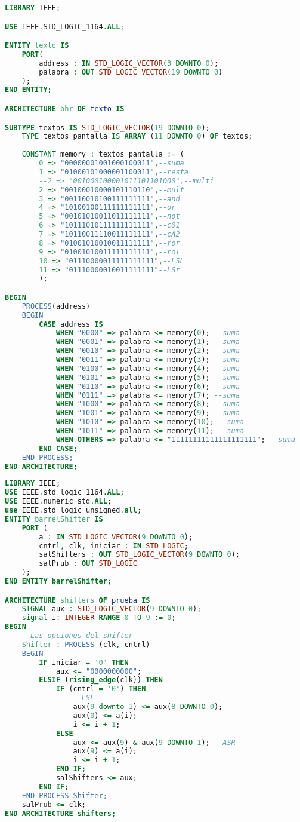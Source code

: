\begin{lstlisting}[language={vhdl}, caption={Display}, label={Script}]
LIBRARY IEEE;

USE IEEE.STD_LOGIC_1164.ALL;

ENTITY texto IS
	PORT(
		address : IN STD_LOGIC_VECTOR(3 DOWNTO 0);
		palabra : OUT STD_LOGIC_VECTOR(19 DOWNTO 0)
	);
END ENTITY;

ARCHITECTURE bhr OF texto IS

SUBTYPE textos IS STD_LOGIC_VECTOR(19 DOWNTO 0);
	TYPE textos_pantalla IS ARRAY (11 DOWNTO 0) OF textos;
	
	CONSTANT memory : textos_pantalla := (
		0 => "00000001001000100011",--suma
		1 => "01000101000001100011",--resta
		--2 => "001000100001011101101000",--multi
		2 => "00100010000101110110",--mult
		3 => "00110010100111111111",--and
		4 => "10100100111111111111",--or
		5 => "00101010011011111111",--not
		6 => "10111010111111111111",--c01
		7 => "10110011110011111111",--cA2
		8 => "01001010010011111111",--ror
		9 => "01001010011111111111",--rol
		10 => "01110000011111111111",--LSL
		11 => "01110000010011111111"--LSr
		);

BEGIN
	PROCESS(address)
	BEGIN
		CASE address IS
			WHEN "0000" => palabra <= memory(0); --suma
			WHEN "0001" => palabra <= memory(1); --suma
			WHEN "0010" => palabra <= memory(2); --suma
			WHEN "0011" => palabra <= memory(3); --suma
			WHEN "0100" => palabra <= memory(4); --suma
			WHEN "0101" => palabra <= memory(5); --suma
			WHEN "0110" => palabra <= memory(6); --suma
			WHEN "0111" => palabra <= memory(7); --suma
			WHEN "1000" => palabra <= memory(8); --suma
			WHEN "1001" => palabra <= memory(9); --suma
			WHEN "1010" => palabra <= memory(10); --suma
			WHEN "1011" => palabra <= memory(11); --suma
			WHEN OTHERS => palabra <= "11111111111111111111"; --suma
		END CASE;
	END PROCESS;
END ARCHITECTURE;
	\end{lstlisting}
	\begin{lstlisting}[language={vhdl}, caption={Barrel Shifter}, label={Script}]
LIBRARY IEEE;
USE IEEE.std_logic_1164.ALL;
USE IEEE.numeric_std.ALL;
use IEEE.std_logic_unsigned.all;
ENTITY barrelShifter IS
    PORT (
        a : IN STD_LOGIC_VECTOR(9 DOWNTO 0);
        cntrl, clk, iniciar : IN STD_LOGIC;
        salShifters : OUT STD_LOGIC_VECTOR(9 DOWNTO 0);
        salPrub : OUT STD_LOGIC
    );
END ENTITY barrelShifter;

ARCHITECTURE shifters OF prueba IS
    SIGNAL aux : STD_LOGIC_VECTOR(9 DOWNTO 0);
    signal i: INTEGER RANGE 0 TO 9 := 0;
BEGIN
    --Las opciones del shifter
    Shifter : PROCESS (clk, cntrl)
    BEGIN
        IF iniciar = '0' THEN
            aux <= "0000000000";
        ELSIF (rising_edge(clk)) THEN
            IF (cntrl = '0') THEN
                --LSL
                aux(9 downto 1) <= aux(8 DOWNTO 0);
                aux(0) <= a(i);
                i <= i + 1;
            ELSE
                aux <= aux(9) & aux(9 DOWNTO 1); --ASR
                aux(9) <= a(i);
                i <= i + 1;
            END IF;
            salShifters <= aux;
        END IF;
    END PROCESS Shifter;
    salPrub <= clk;
END ARCHITECTURE shifters;
	\end{lstlisting}
